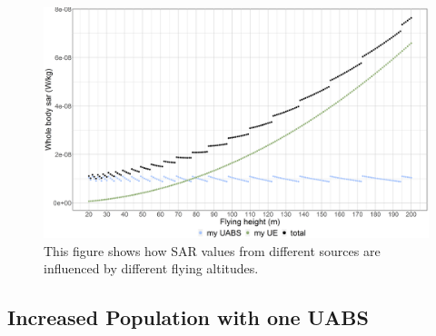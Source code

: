 \documentclass[twocolumn]{phdsymp} %
\begin{document}
\begin{figure}[]
\centering
  \includegraphics[width=\linewidth]{fhvssar_extendedAbstract.png}
  \caption{This figure shows how SAR values from different sources are influenced by different flying altitudes.}
  \label{fig:s1_fhsar}
\end{figure}


\subsection{Increased Population with one UABS}
\end{document}
